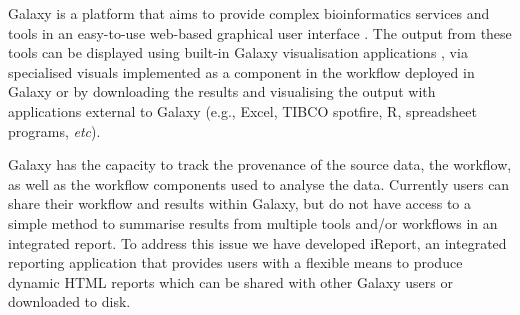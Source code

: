 Galaxy is a platform that aims to provide complex bioinformatics services and tools in an easy-to-use web-based graphical user interface \cite{goecks2010galaxy,blankenberg2010galaxy,giardine2005galaxy}. The output from these tools can be displayed using built-in Galaxy visualisation applications \cite{goecks}, via specialised visuals implemented as a component in the workflow deployed in Galaxy \cite{cgtag} or by downloading the results and visualising the output with applications external to Galaxy (e.g., Excel, TIBCO spotfire, R, spreadsheet programs, \emph{etc}).

Galaxy has the capacity to track the provenance of the source data, the workflow, as well as the workflow components used to analyse the data. Currently users can share their workflow and results within Galaxy, but do not have access to a simple method to summarise results from multiple tools and/or workflows in an integrated report. To address this issue we have developed iReport, an integrated reporting application that provides users with a flexible means to produce dynamic HTML reports which can be shared with other Galaxy users or downloaded to disk.

